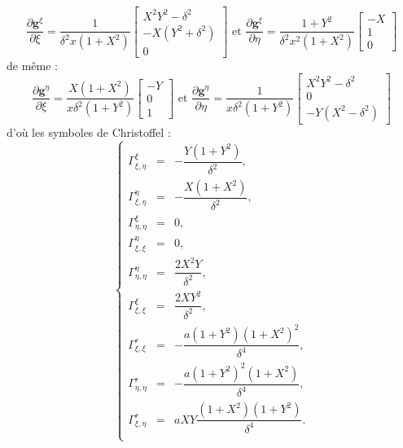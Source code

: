 \begin{equation}
\dfrac{\partial \mathbf{g}^{\xi}}{\partial \xi} = \dfrac{1}{\delta^2 x (1+X^2)} \begin{bmatrix}
X^2Y^2 - \delta^2 \\ -X(Y^2+\delta^2) \\ 0
\end{bmatrix}
\text{ et }
\dfrac{\partial \mathbf{g}^{\xi}}{\partial \eta} = \dfrac{1+Y^2}{\delta^2 x^2 (1+X^2)} \begin{bmatrix}
-X \\ 1 \\ 0
\end{bmatrix}
\end{equation}
de même :
\begin{equation}
\dfrac{\partial \mathbf{g}^{\eta}}{\partial \xi} = \dfrac{X(1+X^2)}{x \delta^2 (1+Y^2)} \begin{bmatrix}
-Y \\ 0 \\ 1
\end{bmatrix}
\text{ et }
\dfrac{\partial \mathbf{g}^{\eta}}{\partial \eta} = \dfrac{1}{x \delta^2 (1+Y^2)} \begin{bmatrix}
X^2 Y^2 - \delta^2 \\ 0 \\ -Y(X^2 - \delta^2)
\end{bmatrix}
\end{equation}
d'où les symboles de Christoffel :
\begin{equation}
\left\lbrace
\begin{array}{rcl}
\Gamma_{\xi,\eta}^{\xi} & = & - \dfrac{Y ( 1+Y^2)}{\delta^2},\\
\Gamma_{\xi,\eta}^{\eta} & = & - \dfrac{X(1+X^2)}{\delta^2},\\
\Gamma_{\eta,\eta}^{\xi} & = & 0, \\
\Gamma_{\xi,\xi}^{\eta} & = & 0, \\
\Gamma_{\eta,\eta}^{\eta} & = & \dfrac{2 X^2 Y}{\delta^2},\\
\Gamma_{\xi,\xi}^{\xi} & = & \dfrac{2 X Y^2}{\delta^2},\\
\Gamma_{\xi,\xi}^{r} & = & - \dfrac{a (1+Y^2)(1+X^2)^2}{\delta^4},\\
\Gamma_{\eta,\eta}^{r} & = & - \dfrac{a (1+Y^2)^2(1+X^2)}{\delta^4}, \\
\Gamma_{\xi,\eta}^r & = & a XY \dfrac{(1+X^2)(1+Y^2)}{\delta^4}.\\
\end{array}
\right.
\end{equation}


